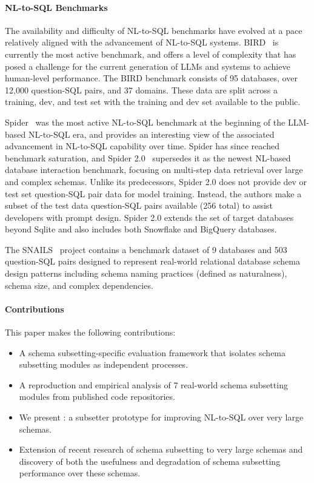 \paragraph{\textbf{NL-to-SQL Benchmarks}}

The availability and difficulty of NL-to-SQL benchmarks have evolved at a pace relatively aligned with the advancement of NL-to-SQL systems.
BIRD~\cite{benchmark-spider} is currently the most active benchmark, and offers a level of complexity that has posed a challenge for the current generation of LLMs and systems to achieve human-level performance.
The BIRD benchmark consists of 95 databases, over 12,000 question-SQL pairs, and 37 domains. 
These data are split across a training, dev, and test set with the training and dev set available to the public.

Spider~\cite{benchmark-spider} was the most active NL-to-SQL benchmark at the beginning of the LLM-based NL-to-SQL era, and provides an interesting view of the associated advancement in NL-to-SQL capability over time.
Spider has since reached benchmark saturation, and Spider 2.0~\cite{benchmark-spider2} supersedes it as the newest NL-based database interaction benchmark, focusing on multi-step data retrieval over large and complex schemas.
Unlike its predecessors, Spider 2.0 does not provide dev or test set question-SQL pair data for model training.
Instead, the authors make a subset of the test data question-SQL pairs available (256 total) to assist developers with prompt design.
Spider 2.0 extends the set of target databases beyond Sqlite and also includes both Snowflake and BigQuery databases.

The SNAILS~\cite{benchmark-snails} project contains a benchmark dataset of 9 databases and 503 question-SQL pairs designed to represent real-world relational database schema design patterns including schema naming practices (defined as naturalness), schema size, and complex dependencies.





\paragraph{\textbf{Contributions}}
This paper makes the following contributions:

\begin{itemize}
  \item A schema subsetting-specific evaluation framework that isolates schema subsetting modules as independent processes.
  \item A reproduction and empirical analysis of 7 real-world schema subsetting modules from published code repositories.
  \item We present \PROJECTNAME: a subsetter prototype for improving NL-to-SQL over very large schemas.
  \item Extension of recent research of schema subsetting to very large schemas and discovery of both the usefulness and degradation of schema subsetting performance over these schemas.
\end{itemize}

